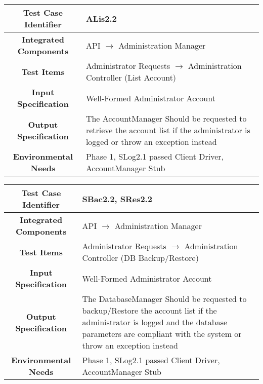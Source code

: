 \documentclass[11pt, a4paper,titlepage]{article}
\begin{document}
 		 \begin{tabularx}{\textwidth}{| c|X|}
	 		 	\hline \textbf{Test Case Identifier} & \label{ALis2.2}ALis2.2 \\
	 		 	\hline \textbf{Integrated Components} &  API $\rightarrow $ Administration Manager \\
	 		 	\hline \textbf{Test Items} &  Administrator Requests  $\rightarrow $ Administration Controller (List Account)\\
	 		 	\hline \textbf{Input Specification} &  Well-Formed Administrator Account\\
	 		 	\hline \textbf{Output Specification} & The AccountManager Should be requested to retrieve the account list if the administrator is logged or throw an exception instead\\
	 		 	\hline \textbf{Environmental Needs} &  Phase 1, SLog2.1 passed \newline 
	 		 	Client Driver, AccountManager Stub\\
	 		 	\hline
 		 \end{tabularx}
 		 \newline
		 
		  \begin{tabularx}{\textwidth}{| c|X|}
		  	\hline \textbf{Test Case Identifier} & \label{SBac2.2}SBac2.2, \label{SRes2.2}SRes2.2 \\
		  	\hline \textbf{Integrated Components} &  API $\rightarrow $ Administration Manager \\
		  	\hline \textbf{Test Items} &  Administrator Requests  $\rightarrow $ Administration Controller (DB Backup/Restore)\\
		  	\hline \textbf{Input Specification} &  Well-Formed Administrator Account\\
		  	\hline \textbf{Output Specification} & The DatabaseManager Should be requested to backup/Restore the account list if the administrator is logged and the database parameters are compliant with the system or throw an exception instead\\
		  	\hline \textbf{Environmental Needs} &  Phase 1, SLog2.1 passed \newline 
		  	Client Driver, AccountManager Stub\\
		  	\hline
		  \end{tabularx}
		  \newline
		  
\end{document}
